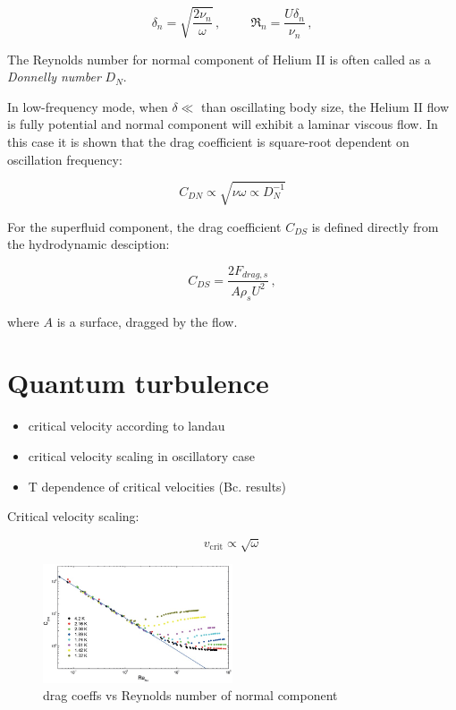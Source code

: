 \begin{equation}
\delta_n = \sqrt{\frac{2\nu_n}{\omega}}\,,
\hspace{1cm}
\Re_n = \frac{U \delta_n}{\nu_n}
\label{twofluid}\,,
\end{equation}

The Reynolds number for normal component of Helium II is often called as a \textit{Donnelly number} $D_N$.

In low-frequency mode, when $\delta \ll$ than oscillating body size, the Helium II flow is fully potential and normal component will exhibit a laminar viscous flow. In this case it is shown that the drag coefficient is square-root dependent on oscillation frequency:

\begin{equation}
C_{DN} \propto \sqrt{\nu \omega \propto D_N^{-1}}
\end{equation}

For the superfluid component, the drag coefficient $C_{DS}$ is defined directly from the hydrodynamic desciption:

\begin{equation}
C_{DS} = \frac{2F_{drag,s}}{A\rho_s U^2}\,,
\end{equation}

where $A$ is a surface, dragged by the flow.

\section{Quantum turbulence}
\begin{itemize}
	\item critical velocity according to landau
	\item critical velocity scaling in oscillatory case
	\item T dependence of critical velocities (Bc. results)
\end{itemize}



Critical velocity scaling:

\begin{equation}
v_{\text{crit}} \propto \sqrt{\omega}
\end{equation}

\begin{figure}[h]
	\centering
	\includegraphics[width=0.5\textwidth]{graphics/theory/C-Re_normal}
	\caption{drag coeffs vs Reynolds number of normal component}
	\label{C-Re_normal}
\end{figure}

